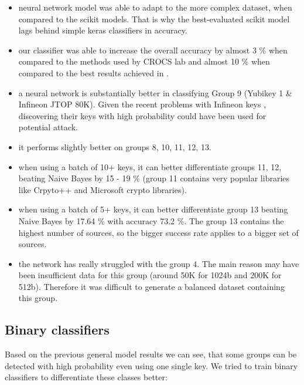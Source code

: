 \begin{itemize}

\item neural network model was able to adapt to the more complex dataset, when compared to the scikit models. That is why the best-evaluated scikit model lags behind simple keras classifiers in accuracy.

\item our classifier was able to increase the overall accuracy by almost 3 \% when compared to the methods used by CROCS lab and almost 10 \% when compared to the best results achieved in \cite{thesis_sekan}.

\item a neural network is substantially better in classifying Group 9 (Yubikey 1 \& Infineon JTOP 80K). Given the recent problems with Infineon keys \cite{svenda_2}, discovering their keys with high probability could have been used for potential attack.

\item it performs slightly better on groups 8, 10, 11, 12, 13. 

\item when using a batch of 10+ keys, it can better differentiate groups 11, 12, beating Naive Bayes by 15 - 19 \% (group 11 contains very popular libraries like Crpyto++ and Microsoft crypto libraries).

\item when using a batch of 5+ keys, it can better differentiate group 13 beating Naive Bayes by 17.64 \% with accuracy 73.2 \%. The group 13 contains the highest number of sources, so the bigger success rate applies to a bigger set of sources.

\item the network has really struggled with the group 4. The main reason may have been insufficient data for this group (around 50K for 1024b and 200K for 512b). Therefore it was difficult to generate a balanced dataset containing this group.

\end{itemize}

\subsection*{Binary classifiers}

Based on the previous general model results we can see, that some groups can be detected with high probability even using one single key. We tried to train binary classifiers to differentiate these classes better:

